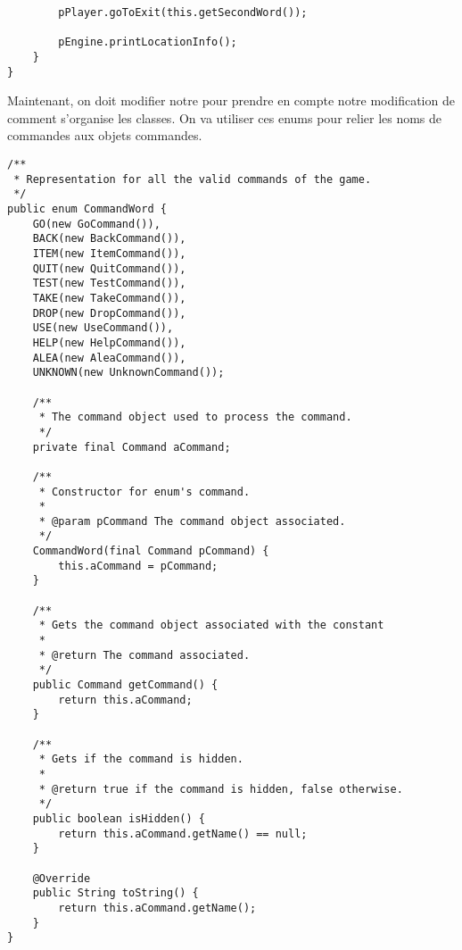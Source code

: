 \begin{exercise}[subtitle=Commande abstraite]
\begin{verbatim}
        pPlayer.goToExit(this.getSecondWord());

        pEngine.printLocationInfo();
    }
}
\end{verbatim}

Maintenant, on doit modifier notre  pour prendre en compte notre modification de comment s'organise les classes. On va utiliser ces enums pour relier les noms de commandes aux objets commandes.

\begin{verbatim}
/**
 * Representation for all the valid commands of the game.
 */
public enum CommandWord {
    GO(new GoCommand()),
    BACK(new BackCommand()),
    ITEM(new ItemCommand()),
    QUIT(new QuitCommand()),
    TEST(new TestCommand()),
    TAKE(new TakeCommand()),
    DROP(new DropCommand()),
    USE(new UseCommand()),
    HELP(new HelpCommand()),
    ALEA(new AleaCommand()),
    UNKNOWN(new UnknownCommand());

    /**
     * The command object used to process the command.
     */
    private final Command aCommand;

    /**
     * Constructor for enum's command.
     *
     * @param pCommand The command object associated.
     */
    CommandWord(final Command pCommand) {
        this.aCommand = pCommand;
    }

    /**
     * Gets the command object associated with the constant
     *
     * @return The command associated.
     */
    public Command getCommand() {
        return this.aCommand;
    }

    /**
     * Gets if the command is hidden.
     *
     * @return true if the command is hidden, false otherwise.
     */
    public boolean isHidden() {
        return this.aCommand.getName() == null;
    }

    @Override
    public String toString() {
        return this.aCommand.getName();
    }
}
\end{verbatim}
\end{exercise}

